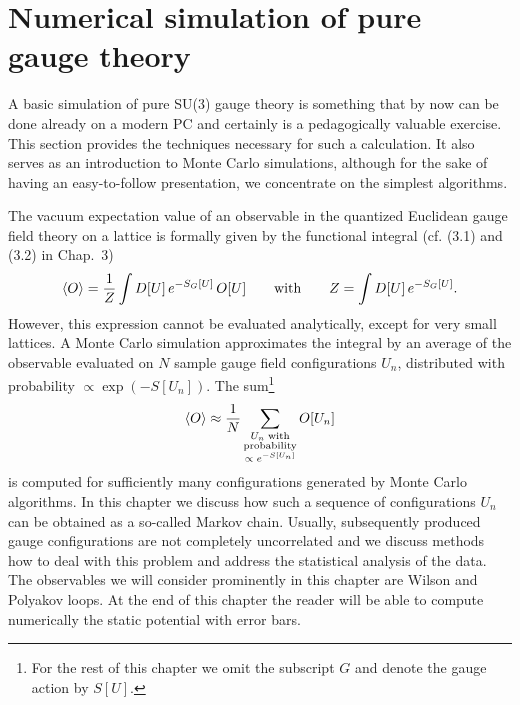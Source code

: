 
\chapter{Numerical simulation of pure gauge theory}

A basic simulation of pure SU(3) gauge theory is something that by now can
be done already on a modern PC and certainly is a pedagogically valuable
exercise. This section provides the techniques necessary for such a calculation.
It also serves as an introduction to Monte Carlo simulations, although for the
sake of having an easy-to-follow presentation, we concentrate on the simplest
algorithms.

The vacuum expectation value of an observable in the quantized Euclidean
gauge field theory on a lattice is formally given by the functional integral (cf.
(3.1) and (3.2) in Chap.~3)
\begin{equation}
  \left\langle O \right\rangle = \frac{1}{Z}\int D[U]\,e^{-S_G[U]}\,O[U]
  \qquad\text{with}\qquad
  Z = \int D[U]\,e^{-S_G[U]}.
\end{equation}
However, this expression cannot be evaluated analytically, except for very
small lattices. A Monte Carlo simulation approximates the integral by an
average of the observable evaluated on $N$ sample gauge field configurations
$U_n$, distributed with probability $\propto \exp(-S[U_n])$. The sum\footnote{For
the rest of this chapter we omit the subscript $G$ and denote the gauge action
by $S[U]$.}
\begin{equation}
  \left\langle O \right\rangle \approx \frac{1}{N}
  \sum_{\substack{U_n \;\mathrm{with}\\ \mathrm{probability}\\ \propto\; e^{-S[U_n]}}} O[U_n]
\end{equation}
is computed for sufficiently many configurations generated by Monte Carlo
algorithms. In this chapter we discuss how such a sequence of configurations
$U_n$ can be obtained as a so-called Markov chain. Usually, subsequently produced gauge configurations are not completely uncorrelated and we discuss
methods how to deal with this problem and address the statistical analysis
of the data. The observables we will consider prominently in this chapter are
Wilson and Polyakov loops. At the end of this chapter the reader will be able
to compute numerically the static potential with error bars.

